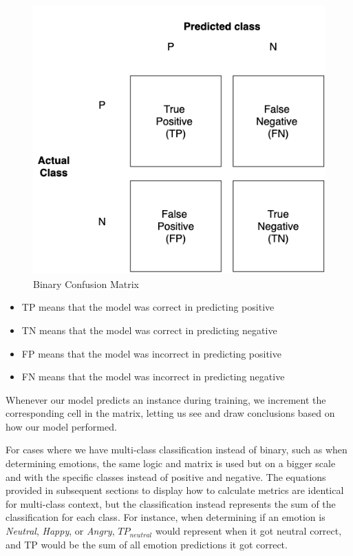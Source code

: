 \documentclass[nofilelist]{cslthse-msc}
\begin{document}
\begin{figure}[h!]
    \centering
    \hbox{\hspace{6em}\includegraphics[width=\textwidth/2]{msccls/explanatory_images/confusion_matrix.png}}
    \caption{Binary Confusion Matrix}
    \label{fig:confusion}
\end{figure}

\begin{itemize}
    \item TP means that the model was correct in predicting positive
    \item TN means that the model was correct in predicting negative
    \item FP means that the model was incorrect in predicting positive
    \item FN means that the model was incorrect in predicting negative
\end{itemize}

Whenever our model predicts an instance during training, we increment the corresponding cell in the matrix, letting us see and draw conclusions based on how our model performed. 


For cases where we have multi-class classification instead of binary, such as when determining emotions, the same logic and matrix is used but on a bigger scale and with the specific classes instead of positive and negative. The equations provided in subsequent sections to display how to calculate metrics are identical for multi-class context, but the classification instead represents the sum of the classification for each class. For instance, when determining if an emotion is \textit{Neutral}, \textit{Happy}, or \textit{Angry}, $TP_{neutral}$ would represent when it got neutral correct, and TP would be the sum of all emotion predictions it got correct.  
\end{document}
